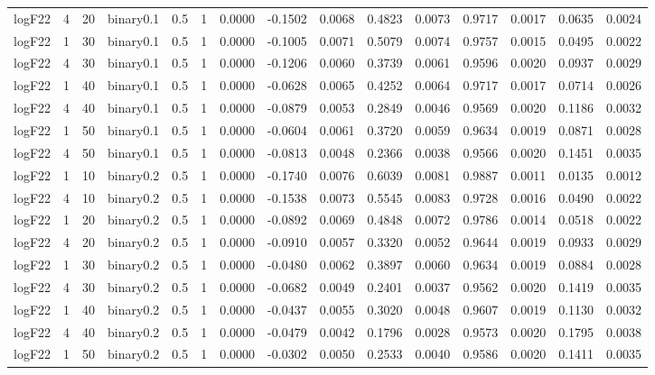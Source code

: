 \begin{longtable}{rrrrrrrrrrrrrrr}
  logF22 & 4 & 20 & binary0.1 & 0.5 & 1 & 0.0000 & -0.1502 & 0.0068 & 0.4823 & 0.0073 & 0.9717 & 0.0017 & 0.0635 & 0.0024 \\ 
  logF22 & 1 & 30 & binary0.1 & 0.5 & 1 & 0.0000 & -0.1005 & 0.0071 & 0.5079 & 0.0074 & 0.9757 & 0.0015 & 0.0495 & 0.0022 \\ 
  logF22 & 4 & 30 & binary0.1 & 0.5 & 1 & 0.0000 & -0.1206 & 0.0060 & 0.3739 & 0.0061 & 0.9596 & 0.0020 & 0.0937 & 0.0029 \\ 
  logF22 & 1 & 40 & binary0.1 & 0.5 & 1 & 0.0000 & -0.0628 & 0.0065 & 0.4252 & 0.0064 & 0.9717 & 0.0017 & 0.0714 & 0.0026 \\ 
  logF22 & 4 & 40 & binary0.1 & 0.5 & 1 & 0.0000 & -0.0879 & 0.0053 & 0.2849 & 0.0046 & 0.9569 & 0.0020 & 0.1186 & 0.0032 \\ 
  logF22 & 1 & 50 & binary0.1 & 0.5 & 1 & 0.0000 & -0.0604 & 0.0061 & 0.3720 & 0.0059 & 0.9634 & 0.0019 & 0.0871 & 0.0028 \\ 
  logF22 & 4 & 50 & binary0.1 & 0.5 & 1 & 0.0000 & -0.0813 & 0.0048 & 0.2366 & 0.0038 & 0.9566 & 0.0020 & 0.1451 & 0.0035 \\ 
  logF22 & 1 & 10 & binary0.2 & 0.5 & 1 & 0.0000 & -0.1740 & 0.0076 & 0.6039 & 0.0081 & 0.9887 & 0.0011 & 0.0135 & 0.0012 \\ 
  logF22 & 4 & 10 & binary0.2 & 0.5 & 1 & 0.0000 & -0.1538 & 0.0073 & 0.5545 & 0.0083 & 0.9728 & 0.0016 & 0.0490 & 0.0022 \\ 
  logF22 & 1 & 20 & binary0.2 & 0.5 & 1 & 0.0000 & -0.0892 & 0.0069 & 0.4848 & 0.0072 & 0.9786 & 0.0014 & 0.0518 & 0.0022 \\ 
  logF22 & 4 & 20 & binary0.2 & 0.5 & 1 & 0.0000 & -0.0910 & 0.0057 & 0.3320 & 0.0052 & 0.9644 & 0.0019 & 0.0933 & 0.0029 \\ 
  logF22 & 1 & 30 & binary0.2 & 0.5 & 1 & 0.0000 & -0.0480 & 0.0062 & 0.3897 & 0.0060 & 0.9634 & 0.0019 & 0.0884 & 0.0028 \\ 
  logF22 & 4 & 30 & binary0.2 & 0.5 & 1 & 0.0000 & -0.0682 & 0.0049 & 0.2401 & 0.0037 & 0.9562 & 0.0020 & 0.1419 & 0.0035 \\ 
  logF22 & 1 & 40 & binary0.2 & 0.5 & 1 & 0.0000 & -0.0437 & 0.0055 & 0.3020 & 0.0048 & 0.9607 & 0.0019 & 0.1130 & 0.0032 \\ 
  logF22 & 4 & 40 & binary0.2 & 0.5 & 1 & 0.0000 & -0.0479 & 0.0042 & 0.1796 & 0.0028 & 0.9573 & 0.0020 & 0.1795 & 0.0038 \\ 
  logF22 & 1 & 50 & binary0.2 & 0.5 & 1 & 0.0000 & -0.0302 & 0.0050 & 0.2533 & 0.0040 & 0.9586 & 0.0020 & 0.1411 & 0.0035 \\ 

\end{longtable}
